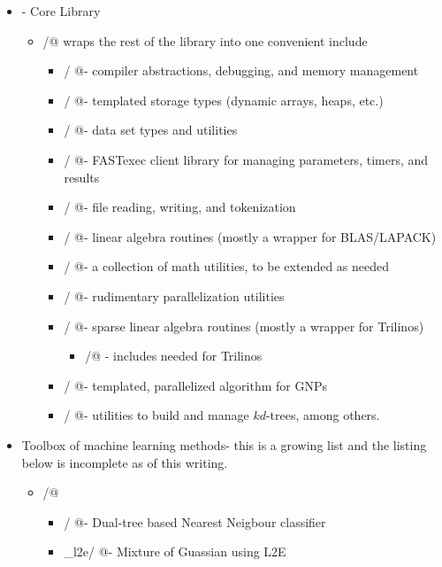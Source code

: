 \documentclass[letter]{report}
\begin{document}
\begin{itemize}

\item - Core Library
  \begin{itemize}
  \item \verb@fastlib/@ wraps the rest of the library into one convenient include
    \begin{itemize}
    \item \verb@base/   @- compiler abstractions, debugging, and memory management
    \item \verb@col/    @- templated storage types (dynamic arrays, heaps, etc.)
    \item \verb@data/   @- data set types and utilities
    \item \verb@fx/     @- FASTexec client library for managing parameters, timers, and results
    \item \verb@file/   @- file reading, writing, and tokenization
    \item \verb@la/     @- linear algebra routines (mostly a wrapper for BLAS/LAPACK)
    \item \verb@math/   @- a collection of math utilities, to be extended as needed
    \item \verb@par/    @- rudimentary parallelization utilities
    \item \verb@sparse/ @- sparse linear algebra routines (mostly a wrapper for Trilinos)
      \begin{itemize}
      \item \verb@trilinos/@ - includes needed for Trilinos
      \end{itemize}
    \item \verb@thor/   @- templated, parallelized algorithm for GNPs
    \item \verb@tree/   @- utilities to build and manage $kd$-trees, among others.
    \end{itemize}
  \end{itemize}
\item Toolbox of machine learning methods- this is a growing list and the listing below is incomplete as of this writing.
  \begin{itemize}
  \item \verb@MLPack/@ 
    \begin{itemize}
      \item \verb@allknn/      @- Dual-tree based Nearest Neigbour classifier
      \item \verb@mog_l2e/     @- Mixture of Guassian using L2E

\end{itemize}
\end{itemize}
\end{itemize}
\end{document}
